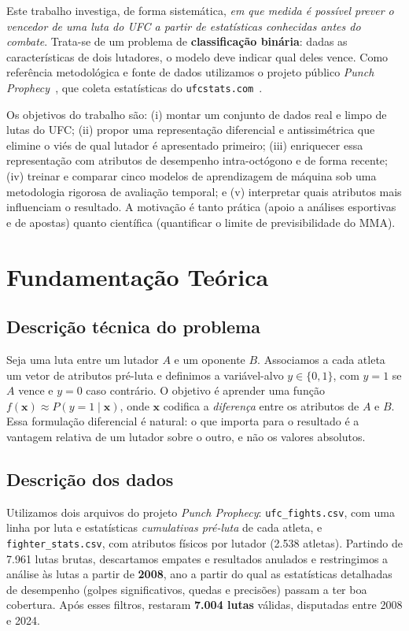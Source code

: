 \documentclass[10pt]{article}
\begin{document}
Este trabalho investiga, de forma sistemática, \emph{em que medida é possível
prever o vencedor de uma luta do UFC a partir de estatísticas conhecidas antes
do combate}. Trata-se de um problema de \textbf{classificação binária}: dadas
as características de dois lutadores, o modelo deve indicar qual deles vence.
Como referência metodológica e fonte de dados utilizamos o projeto público
\emph{Punch Prophecy}~\cite{punchprophecy}, que coleta estatísticas do
\texttt{ufcstats.com}~\cite{ufcstats}.

Os objetivos do trabalho são: (i) montar um conjunto de dados real e limpo de
lutas do UFC; (ii) propor uma representação diferencial e antissimétrica que
elimine o viés de qual lutador é apresentado primeiro; (iii) enriquecer essa
representação com atributos de desempenho intra-octógono e de forma recente;
(iv) treinar e comparar cinco modelos de aprendizagem de máquina sob uma
metodologia rigorosa de avaliação temporal; e (v) interpretar quais atributos
mais influenciam o resultado. A motivação é tanto prática (apoio a análises
esportivas e de apostas) quanto científica (quantificar o limite de
previsibilidade do MMA).

\section{Fundamentação Teórica}

\subsection{Descrição técnica do problema}
Seja uma luta entre um lutador $A$ e um oponente $B$. Associamos a cada atleta
um vetor de atributos pré-luta e definimos a variável-alvo $y \in \{0,1\}$,
com $y=1$ se $A$ vence e $y=0$ caso contrário. O objetivo é aprender uma função
$f(\mathbf{x}) \approx P(y=1 \mid \mathbf{x})$, onde $\mathbf{x}$ codifica a
\emph{diferença} entre os atributos de $A$ e $B$. Essa formulação diferencial é
natural: o que importa para o resultado é a vantagem relativa de um lutador
sobre o outro, e não os valores absolutos.

\subsection{Descrição dos dados}
Utilizamos dois arquivos do projeto \emph{Punch Prophecy}: \texttt{ufc\_fights.csv},
com uma linha por luta e estatísticas \emph{cumulativas pré-luta} de cada
atleta, e \texttt{fighter\_stats.csv}, com atributos físicos por lutador
(2.538 atletas). Partindo de 7.961 lutas brutas, descartamos empates e
resultados anulados e restringimos a análise às lutas a partir de
\textbf{2008}, ano a partir do qual as estatísticas detalhadas de desempenho
(golpes significativos, quedas e precisões) passam a ter boa cobertura. Após
esses filtros, restaram \textbf{7.004 lutas} válidas, disputadas entre 2008 e
2024.
\end{document}
